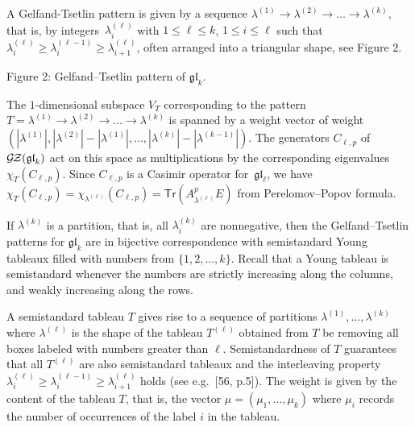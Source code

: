 A Gelfand-Tsetlin pattern is given by a sequence $\lambda^{(1)}\to\lambda^{(2)}\to\dots\to\lambda^{(k)}$, that is, by integers $\lambda^{(\ell)}_{i}$ with $1\leq\ell\leq k$, $1\leq i\leq\ell$ such that $\lambda^{(\ell)}_{i}\geq\lambda^{(\ell-1)}_{i}\geq\lambda^{(\ell)}_{i+1}$, often arranged into a triangular shape, see Figure 2.




Figure 2: Gelfand–Tsetlin pattern of $\mathfrak{gl}_{k}$.



The $1$-dimensional subspace $V_{T}$ corresponding to the pattern $T=\lambda^{(1)}\to\lambda^{(2)}\to\dots\to\lambda^{(k)}$ is spanned by a weight vector of weight $(|\lambda^{(1)}|,|\lambda^{(2)}|-|\lambda^{(1)}|,\dots,|\lambda^{(k)}|-|\lambda^{(k-1)}|)$.
The generators $C_{\ell,p}$ of $\mathcal{G}\hskip-1.00006pt\mathcal{Z}(\mathfrak{gl}_{k})$ act on this space as multiplications by the corresponding eigenvalues $\chi_{T}(C_{\ell,p})$.
Since $C_{\ell,p}$ is a Casimir operator for $\mathfrak{gl}_{\ell}$, we have $\chi_{T}(C_{\ell,p})=\chi_{\lambda^{(\ell)}}(C_{\ell,p})=\mathsf{Tr}(A_{\lambda^{(\ell)}}^{p}E)$ from Perelomov–Popov formula.





If $\lambda^{(k)}$ is a partition, that is, all $\lambda^{(k)}_{i}$ are nonnegative, then the Gelfand–Tsetlin patterns for $\mathfrak{gl}_{k}$ are in bijective correspondence with semistandard Young tableaux filled with numbers from $\{1,2,\dots,k\}$. Recall that a Young tableau is semistandard whenever the numbers are strictly increasing along the columns, and weakly increasing along the rows.





A semistandard tableau $T$ gives rise to a sequence of partitions $\lambda^{(1)},\dots,\lambda^{(k)}$ where $\lambda^{(\ell)}$ is the shape of the tableau $T^{(\ell)}$ obtained from $T$ be removing all boxes labeled with numbers greater than $\ell$.
Semistandardness of $T$ guarantees that all $T^{(\ell)}$ are also semistandard tableaux and the interleaving property $\lambda^{(\ell)}_{i}\geq\lambda^{(\ell-1)}_{i}\geq\lambda^{(\ell)}_{i+1}$ holds (see e.\thinspace{}g. [56, p.5]).
The weight is given by the content of the tableau $T$, that is, the vector $\mu=(\mu_{1},\dots,\mu_{k})$ where $\mu_{i}$ records the number of occurrences of the label $i$ in the tableau.






